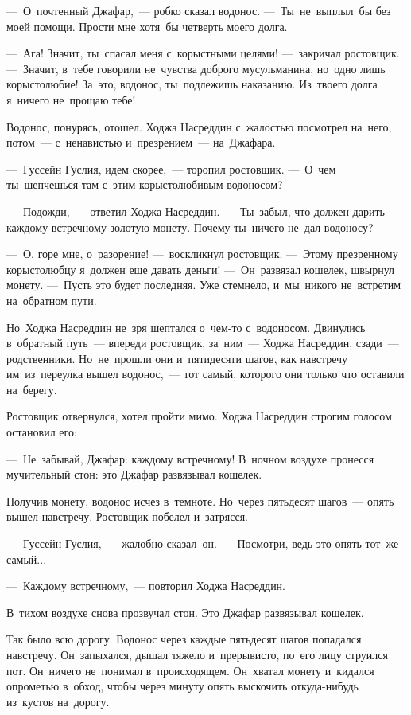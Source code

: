 \documentclass[12pt,a4paper]{book}
\begin{document}
—~О~почтенный Джафар,~— робко сказал водонос. —~Ты~не~выплыл~бы без моей помощи. Прости мне хотя~бы четверть моего долга.

—~Ага! Значит, ты~спасал меня с~корыстными целями! —~закричал ростовщик. —~Значит, в~тебе говорили не~чувства доброго мусульманина, но~одно лишь корыстолюбие! За~это, водонос, ты~подлежишь наказанию. Из~твоего долга я~ничего не~прощаю тебе!

Водонос, понурясь, отошел. Ходжа Насреддин с~жалостью посмотрел на~него, потом~— с~ненавистью и~презрением~— на~Джафара.

—~Гуссейн Гуслия, идем скорее,~— торопил ростовщик. —~О~чем ты~шепчешься там с~этим корыстолюбивым водоносом?

—~Подожди,~— ответил Ходжа Насреддин. —~Ты~забыл, что должен дарить каждому встречному золотую монету. Почему ты~ничего не~дал водоносу?

—~О, горе мне, о~разорение! —~воскликнул ростовщик. —~Этому презренному корыстолюбцу я~должен еще давать деньги! —~Он~развязал кошелек, швырнул монету. —~Пусть это будет последняя. Уже стемнело, и~мы~никого не~встретим на~обратном пути.

Но~Ходжа Насреддин не~зря шептался о~чем-то с~водоносом. Двинулись в~обратный путь~— впереди ростовщик, за~ним~— Ходжа Насреддин, сзади~— родственники. Но~не~прошли они и~пятидесяти шагов, как навстречу им~из~переулка вышел водонос,~— тот самый, которого они только что оставили на~берегу.

Ростовщик отвернулся, хотел пройти мимо. Ходжа Насреддин строгим голосом остановил его:

—~Не~забывай, Джафар: каждому встречному! В~ночном воздухе пронесся мучительный стон: это Джафар развязывал кошелек.

Получив монету, водонос исчез в~темноте. Но~через пятьдесят шагов~— опять вышел навстречу. Ростовщик побелел и~затрясся.

—~Гуссейн Гуслия,~— жалобно сказал~он. —~Посмотри, ведь это опять тот~же самый...

—~Каждому встречному,~— повторил Ходжа Насреддин.

В~тихом воздухе снова прозвучал стон. Это Джафар развязывал кошелек.

Так было всю дорогу. Водонос через каждые пятьдесят шагов попадался навстречу. Он~запыхался, дышал тяжело и~прерывисто, по~его лицу струился пот. Он~ничего не~понимал в~происходящем. Он~хватал монету и~кидался опрометью в~обход, чтобы через минуту опять выскочить откуда-нибудь из~кустов на~дорогу.
\end{document}
